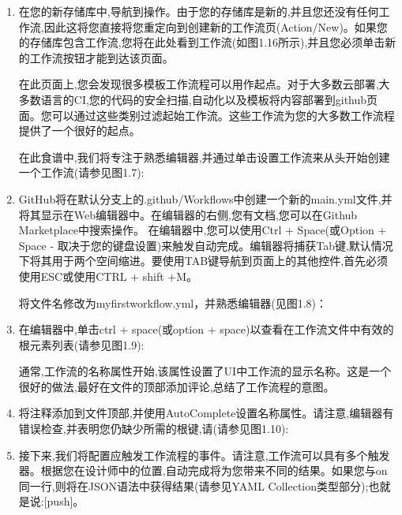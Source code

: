 \begin{enumerate}
\item 
在您的新存储库中,导航到操作。由于您的存储库是新的,并且您还没有任何工作流,因此这将您直接将您重定向到创建新的工作流页(Action/New)。如果您的存储库包含工作流,您将在此处看到工作流(如图1.16所示),并且您必须单击新的工作流按钮才能到达该页面。

在此页面上,您会发现很多模板工作流程可以用作起点。对于大多数云部署,大多数语言的CI,您的代码的安全扫描,自动化以及模板将内容部署到github页面。您可以通过这些类别过滤起始工作流。这些工作流为您的大多数工作流程提供了一个很好的起点。

在此食谱中,我们将专注于熟悉编辑器,并通过单击设置工作流来从头开始创建一个工作流(请参见图1.7):


\item 
GitHub将在默认分支上的.github/Workflows中创建一个新的main.yml文件,并将其显示在Web编辑器中。在编辑器的右侧,您有文档,您可以在Github Marketplace中搜索操作。
在编辑器中,您可以使用Ctrl + Space(或Option + Space - 取决于您的键盘设置)来触发自动完成。编辑器将捕获Tab键,默认情况下将其用于两个空间缩进。要使用TAB键导航到页面上的其他控件,首先必须使用ESC或使用CTRL + shift +M。

将文件名修改为myfirstworkflow.yml，并熟悉编辑器(见图1.8)：


\item 
在编辑器中,单击ctrl + space(或option + space)以查看在工作流文件中有效的根元素列表(请参见图1.9):


通常,工作流的名称属性开始,该属性设置了UI中工作流的显示名称。这是一个很好的做法,最好在文件的顶部添加评论,总结了工作流程的意图。

\item 
将注释添加到文件顶部,并使用AutoComplete设置名称属性。请注意,编辑器有错误检查,并表明您仍缺少所需的根键,请(请参见图1.10):


\item 
接下来,我们将配置应触发工作流程的事件。请注意,工作流可以具有多个触发器。根据您在设计师中的位置,自动完成将为您带来不同的结果。如果您与on同一行,则将在JSON语法中获得结果(请参见YAML Collection类型部分);也就是说:[push]。


\end{enumerate}
